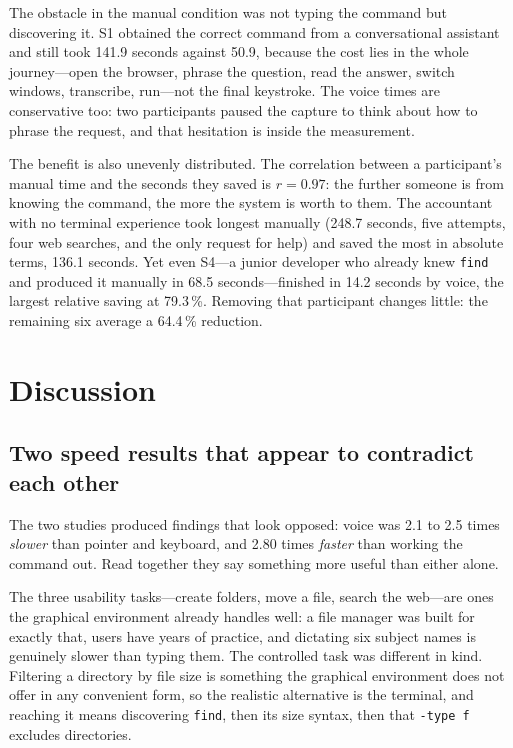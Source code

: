 \documentclass[10pt,a4paper]{article}
\begin{document}
The obstacle in the manual condition was not typing the command but discovering it. S1 obtained the correct command from a conversational assistant and still took 141.9 seconds against 50.9, because the cost lies in the whole journey---open the browser, phrase the question, read the answer, switch windows, transcribe, run---not the final keystroke. The voice times are conservative too: two participants paused the capture to think about how to phrase the request, and that hesitation is inside the measurement.

The benefit is also unevenly distributed. The correlation between a participant's manual time and the seconds they saved is $r = 0.97$: the further someone is from knowing the command, the more the system is worth to them. The accountant with no terminal experience took longest manually (248.7 seconds, five attempts, four web searches, and the only request for help) and saved the most in absolute terms, 136.1 seconds. Yet even S4---a junior developer who already knew \texttt{find} and produced it manually in 68.5 seconds---finished in 14.2 seconds by voice, the largest relative saving at 79.3\,\%. Removing that participant changes little: the remaining six average a 64.4\,\% reduction.

\section{Discussion}
\label{sec:discussion}

\subsection{Two speed results that appear to contradict each other}
\label{subsec:reframing}

The two studies produced findings that look opposed: voice was 2.1 to 2.5 times \emph{slower} than pointer and keyboard, and 2.80 times \emph{faster} than working the command out. Read together they say something more useful than either alone.

The three usability tasks---create folders, move a file, search the web---are ones the graphical environment already handles well: a file manager was built for exactly that, users have years of practice, and dictating six subject names is genuinely slower than typing them. The controlled task was different in kind. Filtering a directory by file size is something the graphical environment does not offer in any convenient form, so the realistic alternative is the terminal, and reaching it means discovering \texttt{find}, then its size syntax, then that \texttt{-type f} excludes directories.
\end{document}
